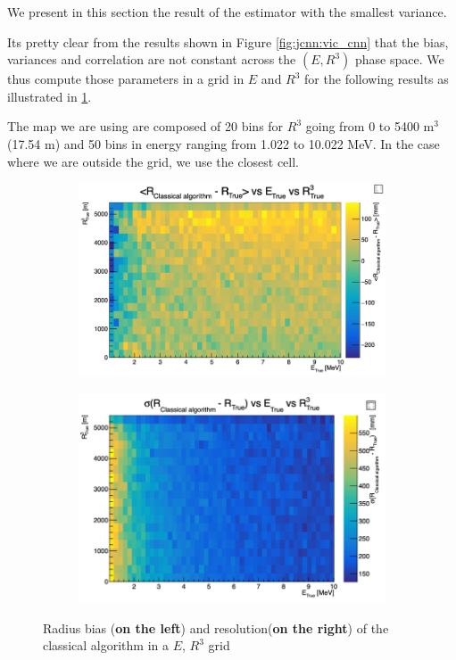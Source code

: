 \documentclass[../main.tex]{subfiles}
\begin{document}
{{We present in this section the result of the estimator with the smallest variance.

Its pretty clear from the results shown in Figure \ref{fig:jcnn:vic_cnn} that the bias, variances and correlation are not constant across the $(E, R^3)$ phase space. We thus compute those parameters in a grid in $E$ and $R^3$ for the following results as illustrated in \ref{fig:jcnn:vic_cnn:res_map}.

The map we are using are composed of 20 bins for $R^3$ going from 0 to 5400 m$^3$ (17.54 m) and 50 bins in energy ranging from 1.022 to 10.022 MeV. In the case where we are outside the grid, we use the closest cell.

\begin{figure}
  \centering
  \begin{subfigure}[t]{0.48\linewidth}
    \includegraphics[width=\linewidth]{images/jcnn/vic_cnn/vic_r_bias.png}
  \end{subfigure}
  \hfill
  \begin{subfigure}[t]{0.48\linewidth}
    \includegraphics[width=\linewidth]{images/jcnn/vic_cnn/vic_r_res.png}
  \end{subfigure}
  \caption{Radius bias (\textbf{on the left}) and resolution(\textbf{on the right}) of the classical algorithm in a $E$, $R^3$ grid}
  \label{fig:jcnn:vic_cnn:res_map}
\end{figure}


}}
\end{document}

